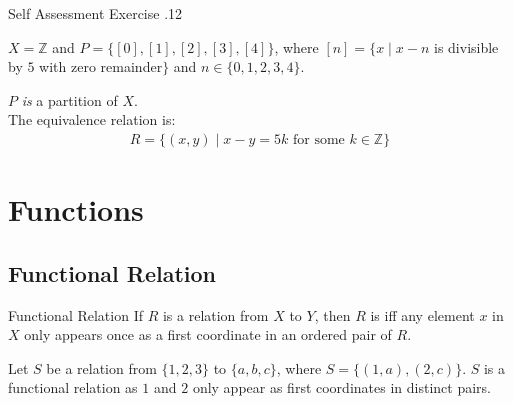 \documentclass[\main/notes.tex]{subfiles}
\begin{document}
\begin{exercise}{Self Assessment Exercise \thechapter.12}
\begin{questions}
\begin{questions}
\begin{answer}
									\end{answer}
								\item $X = \mathbb{Z}$ and $P = \bigl\{[0], [1], [2], [3], [4]\bigr\}$, where $[n] = \{x \mid x - n$ is divisible by $5$ with zero remainder$\}$ and $n \in \{0, 1, 2, 3, 4\}$.\\
									\begin{answer}
										$P$ \emph{is} a partition of $X$.\\
										The equivalence relation is:
										\begin{align*}
											R = \bigl\{(x, y) \mid x - y = 5k \text{ for some } k \in \mathbb{Z}\bigr\}
										\end{align*}
									\end{answer}
							\end{questions}
						\end{questions}
					\end{exercise}
		\pagebreak
		\section{Functions}
			\subsection{Functional Relation}
				\begin{definition}{Functional Relation}
					If $R$ is a relation from $X$ to $Y$, then $R$ is  iff any element $x$ in $X$ only appears once as a first coordinate in an ordered pair of $R$.
				\end{definition}
				\begin{example}
					Let $S$ be a relation from $\{1, 2, 3\}$ to $\{a, b, c\}$, where $S = \bigl\{(1, a), (2, c)\bigr\}$. $S$ is a functional relation as $1$ and $2$ only appear as first coordinates in distinct pairs.
				\end{example}
\end{document}
